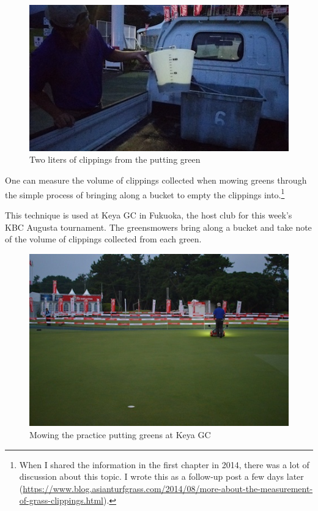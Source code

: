 \documentclass[12pt,b5,]{tufte-book}
\begin{document}
\begin{figure}
\centering
\includegraphics{img/b2-1.png}
\caption{Two liters of clippings from the putting green}
\end{figure}

One can measure the volume of clippings collected when mowing greens through the simple process of bringing along a bucket to empty the clippings into.\footnote{When I shared the information in the first chapter in 2014, there was a lot of discussion about this topic. I wrote this as a follow-up post a few days later (\url{https://www.blog.asianturfgrass.com/2014/08/more-about-the-measurement-of-grass-clippings.html}).}

This technique is used at Keya GC in Fukuoka, the host club for this week's KBC Augusta tournament. The greensmowers bring along a bucket and take note of the volume of clippings collected from each green.

\begin{figure}
\centering
\includegraphics{img/b2-2.png}
\caption{Mowing the practice putting greens at Keya GC}
\end{figure}
\end{document}
